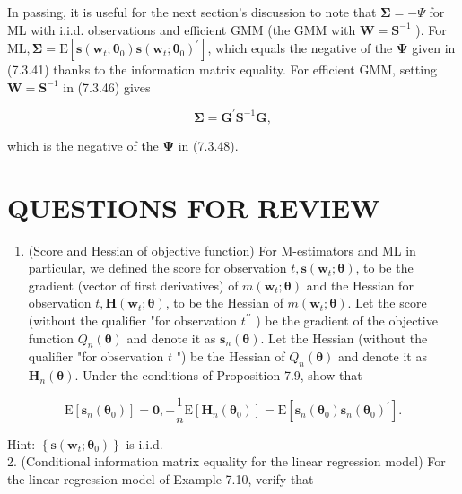 \documentclass[10pt]{article}
\begin{document}
In passing, it is useful for the next section's discussion to note that $\mathbf{\Sigma}=-\Psi$ for ML with i.i.d. observations and efficient GMM (the GMM with $\mathbf{W}=\mathbf{S}^{-1}$ ). For $\mathrm{ML}, \boldsymbol{\Sigma}=\mathrm{E}\left[\mathbf{s}\left(\mathbf{w}_{t} ; \boldsymbol{\theta}_{0}\right) \mathbf{s}\left(\mathbf{w}_{t} ; \boldsymbol{\theta}_{0}\right)^{\prime}\right]$, which equals the negative of the $\boldsymbol{\Psi}$ given in (7.3.41) thanks to the information matrix equality. For efficient GMM, setting $\mathbf{W}=\mathbf{S}^{-1}$ in (7.3.46) gives


\begin{equation*}
\boldsymbol{\Sigma}=\mathbf{G}^{\prime} \mathbf{S}^{-1} \mathbf{G}, \tag{7.3.49}
\end{equation*}


which is the negative of the $\boldsymbol{\Psi}$ in (7.3.48).

\section*{QUESTIONS FOR REVIEW}
\begin{enumerate}
  \item (Score and Hessian of objective function) For M-estimators and ML in particular, we defined the score for observation $t, \mathbf{s}\left(\mathbf{w}_{t} ; \boldsymbol{\theta}\right)$, to be the gradient (vector of first derivatives) of $m\left(\mathbf{w}_{t} ; \boldsymbol{\theta}\right)$ and the Hessian for observation $t, \mathbf{H}\left(\mathbf{w}_{t} ; \boldsymbol{\theta}\right)$, to be the Hessian of $m\left(\mathbf{w}_{t} ; \boldsymbol{\theta}\right)$. Let the score (without the qualifier "for observation $t^{\prime \prime}$ ) be the gradient of the objective function $Q_{n}(\boldsymbol{\theta})$ and denote it as $\mathbf{s}_{n}(\boldsymbol{\theta})$. Let the Hessian (without the qualifier "for observation $t$ ") be the Hessian of $Q_{n}(\boldsymbol{\theta})$ and denote it as $\mathbf{H}_{n}(\boldsymbol{\theta})$. Under the conditions of Proposition 7.9, show that
\end{enumerate}

$$
\mathrm{E}\left[\mathbf{s}_{n}\left(\boldsymbol{\theta}_{0}\right)\right]=\mathbf{0},-\frac{1}{n} \mathrm{E}\left[\mathbf{H}_{n}\left(\boldsymbol{\theta}_{0}\right)\right]=\mathrm{E}\left[\mathbf{s}_{n}\left(\boldsymbol{\theta}_{0}\right) \mathbf{s}_{n}\left(\boldsymbol{\theta}_{0}\right)^{\prime}\right] .
$$

Hint: $\left\{\mathbf{s}\left(\mathbf{w}_{t} ; \boldsymbol{\theta}_{0}\right)\right\}$ is i.i.d.\\
2. (Conditional information matrix equality for the linear regression model) For the linear regression model of Example 7.10, verify that
\end{document}
